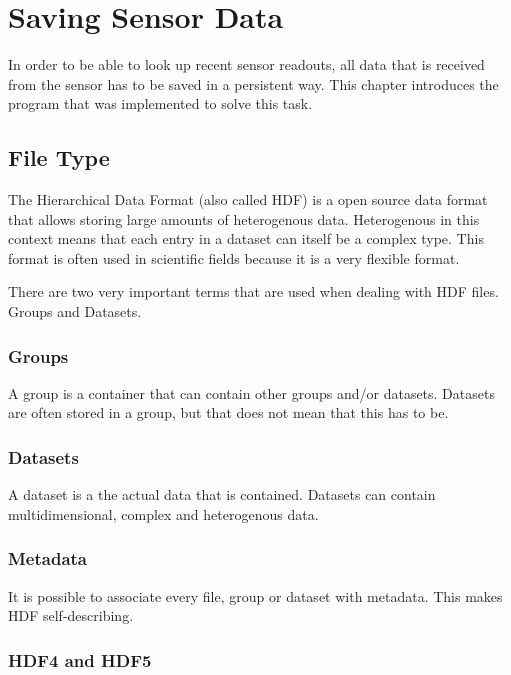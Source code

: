 \chapter{Saving Sensor Data}
\label{ch:faps-save}

\author{Nico Kratky}
%

In order to be able to look up recent sensor readouts, all data that is received from the sensor has to be saved in a persistent way. This chapter introduces the program that was implemented to solve this task.

\section{File Type}

The Hierarchical Data Format (also called HDF) is a open source data format that allows storing large amounts of heterogenous data. Heterogenous in this context means that each entry in a dataset can itself be a complex type. This
format is often used in scientific fields because it is a very flexible format.

There are two very important terms that are used when dealing with HDF files. Groups and Datasets.

\subsection{Groups}

A group is a container that can contain other groups and/or datasets. Datasets are often stored in a group, but that does not mean that this has to be.

\subsection{Datasets}

A dataset is a the actual data that is contained. Datasets can contain multidimensional, complex and heterogenous data.

\subsection{Metadata}

It is possible to associate every file, group or dataset with metadata. This makes HDF self-describing.

\subsection{HDF4 and HDF5}

